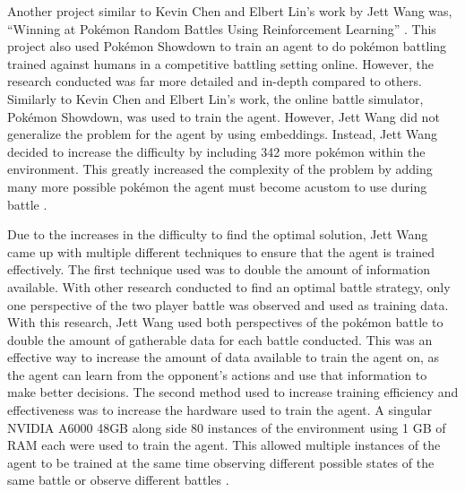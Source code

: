 Another project similar to Kevin Chen and Elbert Lin's work by Jett Wang was, ``Winning at Pokémon Random Battles Using Reinforcement Learning'' \cite{wang2024winning}. This project also used Pokémon Showdown to train an agent to do pokémon battling trained against humans in a competitive battling setting online. However, the research conducted was far more detailed and in-depth compared to others. Similarly to Kevin Chen and Elbert Lin's work, the online battle simulator, Pokémon Showdown, was used to train the agent. However, Jett Wang did not generalize the problem for the agent by using embeddings. Instead, Jett Wang decided to increase the difficulty by including 342 more pokémon within the environment. This greatly increased the complexity of the problem by adding many more possible pokémon the agent must become acustom to use during battle \cite{wang2024winning}. 

Due to the increases in the difficulty to find the optimal solution, Jett Wang came up with multiple different techniques to ensure that the agent is trained effectively. The first technique used was to double the amount of information available. With other research conducted to find an optimal battle strategy, only one perspective of the two player battle was observed and used as training data. With this research, Jett Wang used both perspectives of the pokémon battle to double the amount of gatherable data for each battle conducted. This was an effective way to increase the amount of data available to train the agent on, as the agent can learn from the opponent's actions and use that information to make better decisions. The second method used to increase training efficiency and effectiveness was to increase the hardware used to train the agent. A singular NVIDIA A6000 48GB along side 80 instances of the environment using 1 GB of RAM each were used to train the agent. This allowed multiple instances of the agent to be trained at the same time observing different possible states of the same battle or observe different battles \cite{wang2024winning}. 
 
